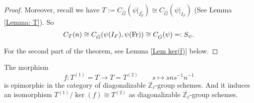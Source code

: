 \begin{proof}
	

    Moreover, recall we have $T:=C_{\hat{G}}(\psi|_{I_F^{\ell}}) \cong C_{\hat{G}}(\psi|_{I_F})$ (See Lemma \ref{Lemma: T}). So 
    $$C_T(n) \cong C_{\hat{G}}(\psi(I_F), \psi(\operatorname{Fr})) \cong C_{\hat{G}}(\psi) =: S_{\psi}.$$

    For the second part of the theorem, see Lemma \ref{Lem ker(f)} below.
	
\end{proof}



\begin{lemma}\label{Lem epic}
	The morphism 
	$$f: T^{(1)} = T \longrightarrow T = T^{(2)} \qquad s \longmapsto sns^{-1}n^{-1}$$
	is epimorphic in the category of diagonalizable $\overline{\mathbb{Z}_{\ell}}$-group schemes. And it induces an isomorphism $T^{(1)}/\ker(f) \cong T^{(2)}$ as diagonalizable $\overline{\mathbb{Z}_{\ell}}$-group schemes.
\end{lemma}

